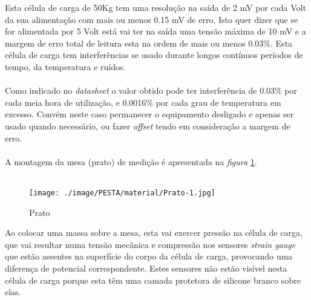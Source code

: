 Esta célula de carga de 50Kg tem uma resolução na saída de 2 mV por cada Volt da sua alimentação com mais ou menos 0.15 mV de erro. Isto quer dizer que se for alimentada por 5 Volt está vai ter na saída uma tensão máxima de 10 mV e a margem de erro total de leitura esta na ordem de mais ou menos 0.03\%.
Esta célula de carga tem interferências se usado durante longos contínuos períodos de tempo, da temperatura e ruídos.
\\
\\
Como indicado no \textit{datasheet} o valor obtido pode ter interferência de 0.03\% por cada meia hora de utilização, e 0.0016\% por cada grau de temperatura em excesso. Convém neste caso permanecer o equipamento desligado e apenas ser usado quando necessário, ou fazer \textit{offset} tendo em consideração a margem de erro.
\\
\\
A montagem da mesa (prato) de medição é apresentada na \textit{figura} \ref{Prato}.
\\
\\
\begin{minipage}[!b]{\linewidth}
\begin{figure}[H]
	\centering
	\texttt{[image: ./image/PESTA/material/Prato-1.jpg]}
	\caption{Prato}
	\label{Prato}
\end{figure}
\end{minipage}
Ao colocar uma massa sobre a mesa, esta vai exercer pressão na célula de carga, que vai resultar numa tensão mecânica e compressão nos sensores \textit{strain gauge} que estão assentes na superfície do corpo da célula de carga, provocando uma diferença de potencial correspondente. Estes sensores não estão visível nesta célula de carga porque esta têm uma camada protetora de silicone branco sobre elas.
